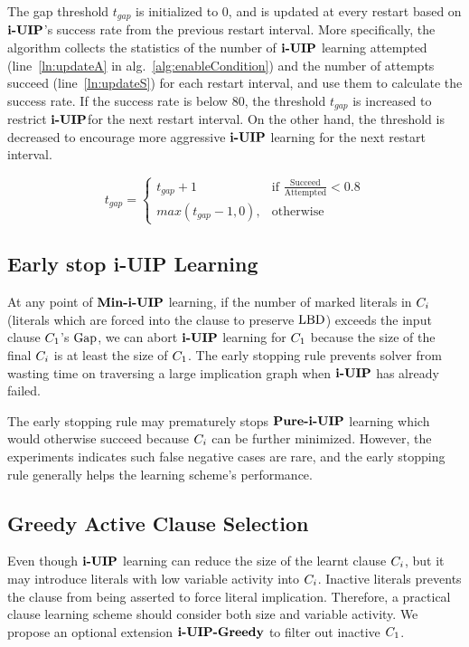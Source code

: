 The gap threshold $t_{gap}$ is initialized to 0, and is updated at every restart based on $\textbf{i-UIP}$'s success rate from the previous restart interval. More specifically, the algorithm collects the statistics of the number of $\textbf{i-UIP}$ learning attempted (line~\ref{ln:updateA} in alg.~\ref{alg:enableCondition}) and the number of attempts succeed (line~\ref{ln:updateS}) for each restart interval, and use them to calculate the success rate. If the success rate is below 80, the threshold $t_{gap}$ is increased to restrict $\textbf{i-UIP}$for the next restart interval. On the other hand, the threshold is decreased to encourage more aggressive $\textbf{i-UIP}$ learning for the next restart interval.

\[
    t_{gap}=
\begin{cases}
    t_{gap} + 1& \text{if } \frac{\text{Succeed}}{\text{Attempted}} < 0.8\\
    max(t_{gap} - 1, 0),              & \text{otherwise}
\end{cases}
\]

\subsection{Early stop i-UIP Learning}
At any point of $\textbf{Min-i-UIP}$ learning, if the number of marked literals in $C_{i}$ (literals which are forced into the clause to preserve $\text{LBD}$) exceeds the input clause $C_{1}$'s $\text{Gap}$, we can abort $\textbf{i-UIP}$ learning for $C_{1}$ because the size of the final $C_{i}$ is at least the size of $C_{1}$.  The early stopping rule prevents solver from wasting time on traversing a large implication graph when $\textbf{i-UIP}$ has already failed. 

The early stopping rule may prematurely stops $\textbf{Pure-i-UIP}$ learning which would otherwise succeed because $C_{i}$ can be further minimized. However, the experiments indicates such false negative cases are rare, and the early stopping rule generally helps the learning scheme's performance.

\subsection{Greedy Active Clause Selection} \label{sec:greedy}
Even though $\textbf{i-UIP}$ learning can reduce the size of the learnt clause $C_{i}$, but it may introduce literals with low variable activity into $C_{i}$.  Inactive literals prevents the clause from being asserted to force literal implication. Therefore, a practical clause learning scheme should consider both size and variable activity. We propose an optional extension $\textbf{i-UIP-Greedy}$ to filter out inactive $C_{1}$.  

